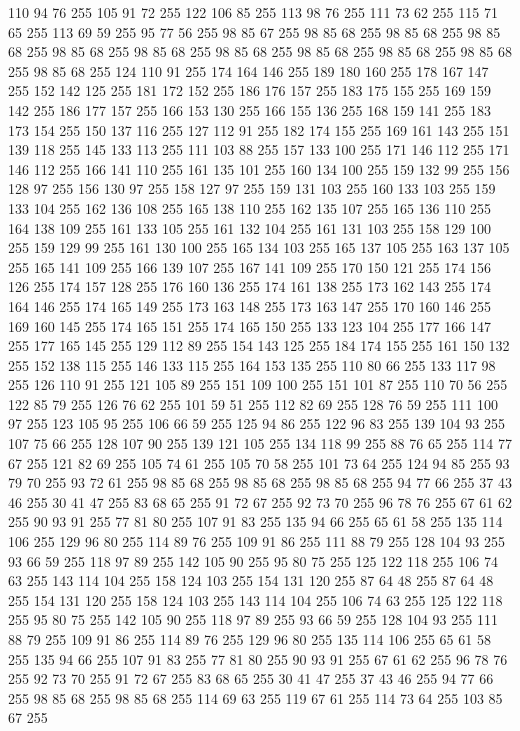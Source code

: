 110 94 76 255 105 91 72 255 122 106 85 255 113 98 76 255 111 73 62 255 115 71 65 255 113 69 59 255 95 77 56 255 98 85 67 255 98 85 68 255 98 85 68 255 98 85 68 255 98 85 68 255 98 85 68 255 98 85 68 255 98 85 68 255 98 85 68 255 98 85 68 255 98 85 68 255 124 110 91 255 174 164 146 255 189 180 160 255 178 167 147 255 152 142 125 255 181 172 152 255 186 176 157 255 183 175 155 255 169 159 142 255 186 177 157 255 166 153 130 255 166 155 136 255 168 159 141 255 183 173 154 255 150 137 116 255 127 112 91 255 182 174 155 255 169 161 143 255 151 139 118 255 145 133 113 255 111 103 88 255 157 133 100 255 171 146 112 255 171 146 112 255 166 141 110 255 161 135 101 255 160 134 100 255 159 132 99 255 156 128 97 255 156 130 97 255 158 127 97 255 159 131 103 255 160 133 103 255 159 133 104 255 162 136 108 255 165 138 110 255 162 135 107 255 165 136 110 255 164 138 109 255 161 133 105 255 161 132 104 255 161 131 103 255 158 129 100 255 159 129 99 255 161 130 100 255
165 134 103 255 165 137 105 255 163 137 105 255 165 141 109 255 166 139 107 255 167 141 109 255 170 150 121 255 174 156 126 255 174 157 128 255 176 160 136 255 174 161 138 255 173 162 143 255 174 164 146 255 174 165 149 255 173 163 148 255 173 163 147 255 170 160 146 255 169 160 145 255 174 165 151 255 174 165 150 255 133 123 104 255 177 166 147 255 177 165 145 255 129 112 89 255 154 143 125 255 184 174 155 255 161 150 132 255 152 138 115 255 146 133 115 255 164 153 135 255 110 80 66 255 133 117 98 255 126 110 91 255 121 105 89 255 151 109 100 255 151 101 87 255 110 70 56 255 122 85 79 255 126 76 62 255 101 59 51 255 112 82 69 255 128 76 59 255 111 100 97 255 123 105 95 255 106 66 59 255 125 94 86 255 122 96 83 255 139 104 93 255 107 75 66 255 128 107 90 255 139 121 105 255 134 118 99 255 88 76 65 255 114 77 67 255 121 82 69 255 105 74 61 255 105 70 58 255 101 73 64 255 124 94 85 255 93 79 70 255 93 72 61 255 98 85 68 255 98 85 68 255 98 85 68 255
94 77 66 255 37 43 46 255 30 41 47 255 83 68 65 255 91 72 67 255 92 73 70 255 96 78 76 255 67 61 62 255 90 93 91 255 77 81 80 255 107 91 83 255 135 94 66 255 65 61 58 255 135 114 106 255 129 96 80 255 114 89 76 255 109 91 86 255 111 88 79 255 128 104 93 255 93 66 59 255 118 97 89 255 142 105 90 255 95 80 75 255 125 122 118 255 106 74 63 255 143 114 104 255 158 124 103 255 154 131 120 255 87 64 48 255 87 64 48 255 154 131 120 255 158 124 103 255 143 114 104 255 106 74 63 255 125 122 118 255 95 80 75 255 142 105 90 255 118 97 89 255 93 66 59 255 128 104 93 255 111 88 79 255 109 91 86 255 114 89 76 255 129 96 80 255 135 114 106 255 65 61 58 255 135 94 66 255 107 91 83 255 77 81 80 255 90 93 91 255 67 61 62 255 96 78 76 255 92 73 70 255 91 72 67 255 83 68 65 255 30 41 47 255 37 43 46 255 94 77 66 255 98 85 68 255 98 85 68 255 114 69 63 255 119 67 61 255 114 73 64 255 103 85 67 255
